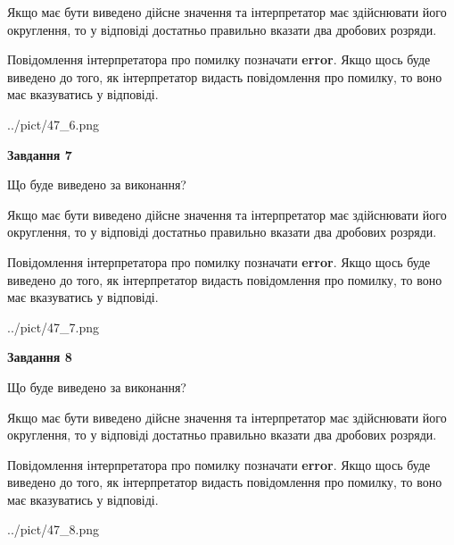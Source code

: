 \documentclass[12pt, ukrainian]{article}
\begin{document}
{\begin {Large}
Якщо має бути виведено дійсне значення та інтерпретатор має здійснювати його округлення, 
то у відповіді достатньо правильно вказати два дробових розряди.

Повідомлення інтерпретатора про помилку позначати \textbf{error}.
Якщо щось буде виведено до того, як інтерпретатор видасть повідомлення про помилку, 
то воно має вказуватись у відповіді. \par

\begin{center}
	{../pict/47_6.png}
\end{center}
\newpage

{\begin {center}\textbf{Завдання 7}\end {center}}\par
Що буде виведено за виконання? \par

Якщо має бути виведено дійсне значення та інтерпретатор має здійснювати його округлення, 
то у відповіді достатньо правильно вказати два дробових розряди.

Повідомлення інтерпретатора про помилку позначати \textbf{error}.
Якщо щось буде виведено до того, як інтерпретатор видасть повідомлення про помилку, 
то воно має вказуватись у відповіді. \par

\begin{center}
	{../pict/47_7.png}
\end{center}
\newpage

{\begin {center}\textbf{Завдання 8}\end {center}}\par
Що буде виведено за виконання? \par

Якщо має бути виведено дійсне значення та інтерпретатор має здійснювати його округлення, 
то у відповіді достатньо правильно вказати два дробових розряди.

Повідомлення інтерпретатора про помилку позначати \textbf{error}.
Якщо щось буде виведено до того, як інтерпретатор видасть повідомлення про помилку, 
то воно має вказуватись у відповіді. \par

\begin{center}
	{../pict/47_8.png}
\end{center}
\newpage


\end{Large}}
\end{document}
